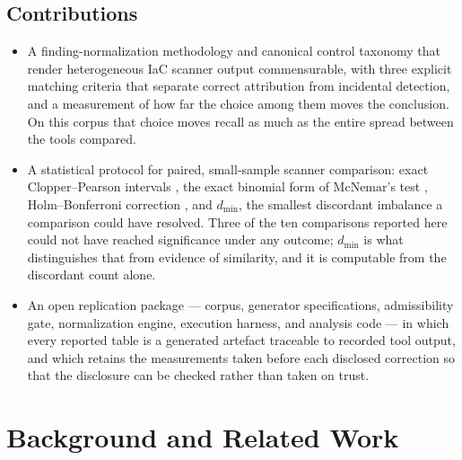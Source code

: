 \documentclass[smallextended]{svjour3}
\begin{document}
\subsection{Contributions}
\begin{itemize}
\item A finding-normalization methodology and canonical control taxonomy that
render heterogeneous IaC scanner output commensurable, with three explicit
matching criteria that separate correct attribution from incidental detection,
and a measurement of how far the choice among them moves the conclusion. On this
corpus that choice moves recall as much as the entire spread between the tools
compared.
\item A statistical protocol for paired, small-sample scanner comparison: exact
Clopper--Pearson intervals \citep{clopper1934use}, the exact binomial form of
McNemar's test \citep{mcnemar1947note, dietterich1998approximate},
Holm--Bonferroni correction \citep{holm1979simple}, and $d_{\min}$, the smallest
discordant imbalance a comparison could have resolved. Three of the ten
comparisons reported here could not have reached significance under any outcome;
$d_{\min}$ is what distinguishes that from evidence of similarity, and it is
computable from the discordant count alone.
\item An open replication package --- corpus, generator specifications,
admissibility gate, normalization engine, execution harness, and analysis code
--- in which every reported table is a generated artefact traceable to recorded
tool output, and which retains the measurements taken before each disclosed
correction so that the disclosure can be checked rather than taken on trust.
\end{itemize}

\section{Background and Related Work}
\label{sec:related}
\end{document}
